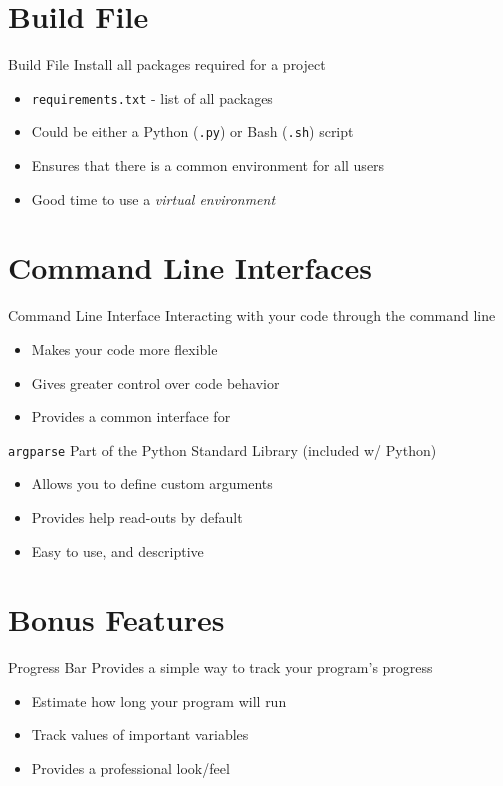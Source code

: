\documentclass[12pt,t]{beamer}
\begin{document}
\section{Build File}

\begin{frame}{Build File}
	Install all packages required for a project
	\begin{itemize}
		\item \texttt{requirements.txt} - list of all packages
		\item Could be either a Python (\texttt{.py}) or Bash (\texttt{.sh}) script
		\item Ensures that there is a common environment for all users
		\item Good time to use a \emph{virtual environment}
	\end{itemize}
\end{frame}

\section{Command Line Interfaces}

\begin{frame}{Command Line Interface}
	Interacting with your code through the command line
	\begin{itemize}
		\item Makes your code more flexible
		\item Gives greater control over code behavior
		\item Provides a common interface for 
	\end{itemize}
\end{frame}

\begin{frame}{\texttt{argparse}}
	Part of the Python Standard Library (included w/ Python)
	\begin{itemize}
		\item Allows you to define custom arguments
		\item Provides help read-outs by default
		\item Easy to use, and descriptive
	\end{itemize}
\end{frame}

\section{Bonus Features}

\begin{frame}{Progress Bar}
	Provides a simple way to track your program's progress
	\begin{itemize}
		\item Estimate how long your program will run
		\item Track values of important variables
		\item Provides a professional look/feel
	\end{itemize}
\end{frame}
\end{document}
